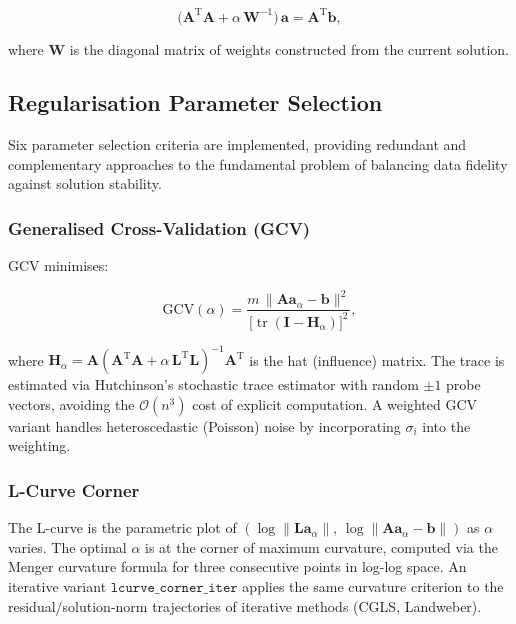 \documentclass[a4paper,11pt]{article}
\DeclareMathOperator{\tr}{tr}
\begin{document}
\begin{equation}
  \bigl(\bm{A}^\mathrm{T}\bm{A} + \alpha\,\bm{W}^{-1}\bigr)\,\bm{a} = \bm{A}^\mathrm{T}\bm{b},
\end{equation}

where $\bm{W}$ is the diagonal matrix of weights constructed from the
current solution.

\subsection{Regularisation Parameter Selection}\label{sec:criteria}

Six parameter selection criteria are implemented, providing redundant
and complementary approaches to the fundamental problem of balancing
data fidelity against solution stability.

\subsubsection{Generalised Cross-Validation (GCV)}

GCV \citep{golub1979generalized} minimises:

\begin{equation}
  \mathrm{GCV}(\alpha) = \frac{m\,\|\bm{A}\bm{a}_\alpha - \bm{b}\|^2}{\bigl[\tr(\bm{I} - \bm{H}_\alpha)\bigr]^2},
\end{equation}

where $\bm{H}_\alpha = \bm{A}(\bm{A}^\mathrm{T}\bm{A} + \alpha\,\bm{L}^\mathrm{T}\bm{L})^{-1}\bm{A}^\mathrm{T}$
is the hat (influence) matrix.  The trace is estimated via Hutchinson's
stochastic trace estimator with random $\pm 1$ probe vectors, avoiding
the $\mathcal{O}(n^3)$ cost of explicit computation.  A weighted GCV
variant handles heteroscedastic (Poisson) noise by incorporating
$\sigma_i$ into the weighting.

\subsubsection{L-Curve Corner}

The L-curve \citep{hansen1992analysis} is the parametric plot of
$(\log\|\bm{L}\bm{a}_\alpha\|,\, \log\|\bm{A}\bm{a}_\alpha - \bm{b}\|)$
as $\alpha$ varies.  The optimal $\alpha$ is at the corner of maximum
curvature, computed via the Menger curvature formula for three
consecutive points in log-log space.  An iterative variant
$\texttt{lcurve\_corner\_iter}$ applies the same curvature criterion to
the residual/solution-norm trajectories of iterative methods (CGLS,
Landweber).
\end{document}
